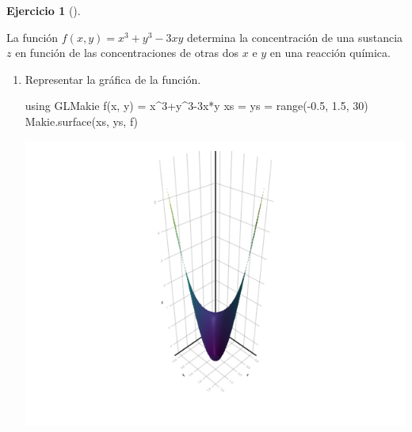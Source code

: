 \documentclass[
  a4paper,
]{scrreport}
\newenvironment{Shaded}{\begin{snugshade}}{\end{snugshade}}
\newcommand{\BuiltInTok}[1]{\textcolor[rgb]{0.00,0.23,0.31}{#1}}
\newcommand{\FloatTok}[1]{\textcolor[rgb]{0.68,0.00,0.00}{#1}}
\newcommand{\FunctionTok}[1]{\textcolor[rgb]{0.28,0.35,0.67}{#1}}
\newcommand{\ImportTok}[1]{\textcolor[rgb]{0.00,0.46,0.62}{#1}}
\newcommand{\NormalTok}[1]{\textcolor[rgb]{0.00,0.23,0.31}{#1}}
\newcommand{\OperatorTok}[1]{\textcolor[rgb]{0.37,0.37,0.37}{#1}}
\theoremstyle{definition}
\newtheorem{exercise}{Ejercicio}[chapter]
\theoremstyle{remark}
\begin{document}
\begin{exercise}[]\protect\hypertarget{exr-extremos}{}\label{exr-extremos}

La función \(f(x,y) = x^3+y^3-3xy\) determina la concentración de una
sustancia \(z\) en función de las concentraciones de otras dos \(x\) e
\(y\) en una reacción química.

\begin{enumerate}
\def\labelenumi{\alph{enumi}.}
\item
  Representar la gráfica de la función.

  \begin{tcolorbox}[enhanced jigsaw, bottomtitle=1mm, rightrule=.15mm, left=2mm, colback=white, title=\textcolor{quarto-callout-tip-color}{\faLightbulb}\hspace{0.5em}{Solución}, bottomrule=.15mm, colframe=quarto-callout-tip-color-frame, toprule=.15mm, leftrule=.75mm, opacityback=0, coltitle=black, breakable, colbacktitle=quarto-callout-tip-color!10!white, arc=.35mm, toptitle=1mm, titlerule=0mm, opacitybacktitle=0.6]

\begin{Shaded}
\begin{Highlighting}[]
\ImportTok{using} \BuiltInTok{GLMakie}
\FunctionTok{f}\NormalTok{(x, y) }\OperatorTok{=}\NormalTok{ x}\OperatorTok{\^{}}\FloatTok{3}\OperatorTok{+}\NormalTok{y}\OperatorTok{\^{}}\FloatTok{3}\OperatorTok{{-}}\FloatTok{3}\NormalTok{x}\OperatorTok{*}\NormalTok{y}
\NormalTok{xs }\OperatorTok{=}\NormalTok{ ys }\OperatorTok{=} \FunctionTok{range}\NormalTok{(}\OperatorTok{{-}}\FloatTok{0.5}\NormalTok{, }\FloatTok{1.5}\NormalTok{, }\FloatTok{30}\NormalTok{)}
\NormalTok{Makie.}\FunctionTok{surface}\NormalTok{(xs, ys, f)}
\end{Highlighting}
\end{Shaded}

  \includegraphics{09-derivadas-funciones-varias-variables_files/figure-pdf/cell-36-output-1.png}


\end{tcolorbox}
\end{enumerate}
\end{exercise}
\end{document}
